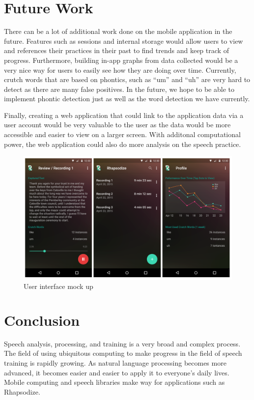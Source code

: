 \documentclass{sigchi}
\begin{document}
\section{Future Work}
There can be a lot of additional work done on the mobile application in the future. Features such as sessions and internal storage would allow users to view and references their practices in their past to find trends and keep track of progress. Furthermore, building in-app graphs from data collected would be a very nice way for users to easily see how they are doing over time. Currently, crutch words that are based on phontics, such as ``um'' and ``uh'' are very hard to detect as there are many false positives. In the future, we hope to be able to implement phontic detection just as well as the word detection we have currently.

Finally, creating a web application that could link to the application data via a user account would be very valuable to the user as the data would be more accessible and easier to view on a larger screen. With additonal computational power, the web application could also do more analysis on the speech practice.

\begin{figure}[!h]
\centering
\includegraphics[width=0.9\columnwidth]{future}
\caption{User interface mock up
}
\label{fig:figure4}
\end{figure}

\section{Conclusion}

Speech analysis, processing, and training is a very broad and complex process. The field of using ubiquitous computing to make progress in the field of speech training is rapidly growing. As natural language processing becomes more advanced, it becomes easier and easier to apply it to everyone's daily lives. Mobile computing and speech libraries make way for applications such as Rhapsodize. 
\end{document}
